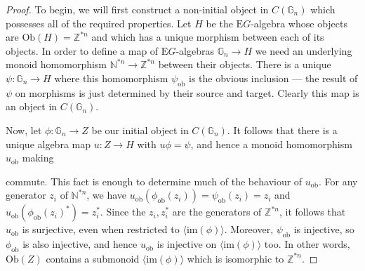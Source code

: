 \documentclass{amsart} %
\newenvironment{eq*}{\begin{equation*}}{\end{equation*}}
\begin{document}
\begin{proof}
To begin, we will first construct a non-initial object in $C(\mathbb{G}_n)$ which possesses all of the required properties. Let $H$ be the $\mathrm{E}G$-algebra whose objects are $\mathrm{Ob}(H) = \mathbb{Z}^{*n}$ and which has a unique morphism between each of its objects. In order to define a map of $\mathrm{E}G$-algebras $\mathbb{G}_n \to H$ we need an underlying monoid homomorphism $\mathbb{N}^{*n} \to \mathbb{Z}^{*n}$ between their objects. There is a unique $\psi: \mathbb{G}_n \to H$ where this homomorphism $\psi_{\mathrm{ob}}$ is the obvious inclusion --- the result of $\psi$ on morphisms is just determined by their source and target. Clearly this map is an object in $C(\mathbb{G}_n)$.

Now, let $\phi: \mathbb{G}_n \to Z$ be our initial object in $C(\mathbb{G}_n)$. It follows that there is a unique algebra map $u: Z \to H$ with $u\phi = \psi$, and hence a monoid homomorphism $u_{\mathrm{ob}}$ making
\begin{eq*} 
\end{eq*}
commute. This fact is enough to determine much of the behaviour of $u_{\mathrm{ob}}$. For any generator $z_i$ of $\mathbb{N}^{*n}$, we have $u_{\mathrm{ob}}(\phi_{\mathrm{ob}}(z_i)) = \psi_{\mathrm{ob}}(z_i) = z_i$ and $u_{\mathrm{ob}}(\phi_{\mathrm{ob}}(z_i)^*) = z_i^*$. Since the $z_i, z_i^*$ are the generators of $\mathbb{Z}^{*n}$, it follows that $u_{\mathrm{ob}}$ is surjective, even when restricted to $\langle \mathrm{im}(\phi) \rangle$. Moreover, $\psi_{\mathrm{ob}}$ is injective, so $\phi_{\mathrm{ob}}$ is also injective, and hence $u_{\mathrm{ob}}$ is injective on $\langle \mathrm{im}(\phi) \rangle$ too. In other words, $\mathrm{Ob}(Z)$ contains a submonoid $\langle \mathrm{im}(\phi) \rangle$ which is isomorphic to $\mathbb{Z}^{*n}$. 


\end{proof}
\end{document}
